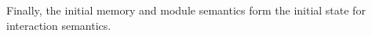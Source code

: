 Finally, the initial memory and module semantics form the initial state for interaction semantics.











